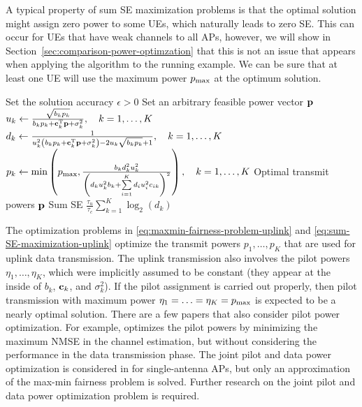 A typical property of sum SE maximization problems is that the optimal solution might assign zero power to some UEs, which naturally leads to zero SE. This can occur for UEs that have weak channels to all APs, however, we will show in Section~\ref{sec:comparison-power-optimzation}  that this is not an issue that appears when applying the algorithm to the running example. We can be sure that at least one UE will use the maximum power $p_{\textrm{max}}$ at the optimum solution.


\begin{algorithm}
	\caption{Block coordinate descent algorithm for solving the sum SE maximization problem in \eqref{eq:sum-SE-maximization-uplink}.} \label{alg:sum-SE-uplink}
	\begin{algorithmic}[1]
		 Set the solution accuracy $\epsilon>0$
		\State Set an arbitrary feasible power vector $\mathbf{p}$
		\State $u_{k} \gets \frac{\sqrt{b_kp_k}}{b_kp_k+\vect{c}_k^{\Ttran}\vect{p}+\sigma_k^2}, \quad k=1,\ldots,K$
		\State $d_k \gets \frac{1}{u_{k}^2\left(b_kp_k+\vect{c}_k^{\Ttran}\vect{p}+\sigma_k^2\right) -2u_{k}\sqrt{b_kp_k}+1}, \quad k=1,\ldots,K$
		\State $p_k \gets \min\left(p_{\textrm{max}}, \frac{b_kd_k^2u_k^2}{\left(d_ku_k^2b_k+\sum\limits_{i=1}^Kd_iu_i^2c_{ik}\right)^2}  \right), \quad k=1,\ldots,K$
		\EndWhile
		 Optimal transmit powers $\mathbf{p}$
		\State Sum SE $\frac{\tau_u}{\tau_c}\sum_{k=1}^K\log_2\left(d_k\right)$
	\end{algorithmic}
\end{algorithm}

\begin{remark}
The optimization problems in \eqref{eq:maxmin-fairness-problem-uplink} and \eqref{eq:sum-SE-maximization-uplink} optimize the transmit powers $p_1,\ldots,p_K$ that are used for uplink data transmission. The uplink transmission also involves the pilot powers $\eta_1,\ldots,\eta_K$, which were implicitly assumed to be constant (they appear at the inside of $b_k$, $\mathbf{c}_k$, and $\sigma_k^2$). If the pilot assignment is carried out properly, then pilot transmission with maximum power $\eta_1=\ldots=\eta_K= p_{\textrm{max}}$ is expected to be a nearly optimal solution. There are a few papers that also consider pilot power optimization. For example, \cite{Mai2018} optimizes the pilot powers by minimizing the maximum NMSE in the channel estimation, but without considering the performance in the data transmission phase. 
The joint pilot and data power optimization is considered in \cite{Masoumi2018} for single-antenna APs, but only an approximation of the max-min fairness problem is solved. Further research on the joint pilot and data power optimization problem is required.
\end{remark}




